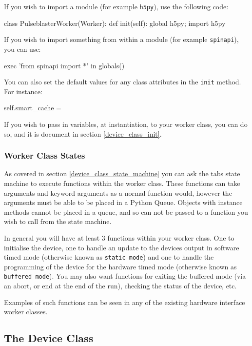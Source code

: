 \documentclass[12pt]{article}
\begin{document}
If you wish to import a module (for example \texttt{h5py}), use the following code:
\begin{python}
class PulseblasterWorker(Worker):
    def init(self):
        global h5py; import h5py
\end{python}

If you wish to import something from within a module (for example \texttt{spinapi}), you can use:
\begin{python}
        exec 'from spinapi import *' in globals()
\end{python}

You can also set the default values for any class attributes in the \texttt{init} method. For instance:
\begin{python}
        self.smart_cache = {}
\end{python}

If you wish to pass in variables, at instantiation, to your worker class, you can do so, and it is document in section \ref{device_class_init}.

\subsubsection{Worker Class States}
As covered in section \ref{device_class_state_machine} you can ask the tabs state machine to execute functions within the worker class. These functions can take arguments and keyword arguments as a normal function would, however the arguments must be able to be placed in a Python Queue. Objects with instance methods cannot be placed in a queue, and so can not be passed to a function you wish to call from the state machine.

In general you will have at least 3 functions within your worker class. One to initialise the device, one to handle an update to the devices output in software timed mode (otherwise known as \texttt{static mode}) and one to handle the programming of the device for the hardware timed mode (otherwise known as \texttt{buffered mode}). You may also want functions for exiting the buffered mode (via an abort, or end at the end of the run), checking the status of the device, etc.

Examples of such functions can be seen in any of the existing hardware interface worker classes.

\newpage
\subsection{The Device Class}\label{device_class}
\end{document}
